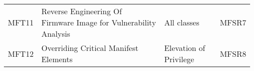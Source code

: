 \begin{longtable}[]{@{}llll@{}}
\begin{minipage}[t]{0.05\columnwidth}
MFT11\strut
\end{minipage} & \begin{minipage}[t]{0.44\columnwidth}\raggedright\strut
Reverse Engineering Of Firmware Image for Vulnerability Analysis\strut
\end{minipage} & \begin{minipage}[t]{0.30\columnwidth}\raggedright\strut
All classes\strut
\end{minipage} & \begin{minipage}[t]{0.09\columnwidth}\raggedright\strut
MFSR7\strut
\end{minipage}\tabularnewline
\begin{minipage}[t]{0.05\columnwidth}\raggedright\strut
MFT12\strut
\end{minipage} & \begin{minipage}[t]{0.44\columnwidth}\raggedright\strut
Overriding Critical Manifest Elements\strut
\end{minipage} & \begin{minipage}[t]{0.30\columnwidth}\raggedright\strut
Elevation of Privilege\strut
\end{minipage} & \begin{minipage}[t]{0.09\columnwidth}\raggedright\strut
MFSR8\strut
\end{minipage}\tabularnewline
\bottomrule
\end{longtable}
